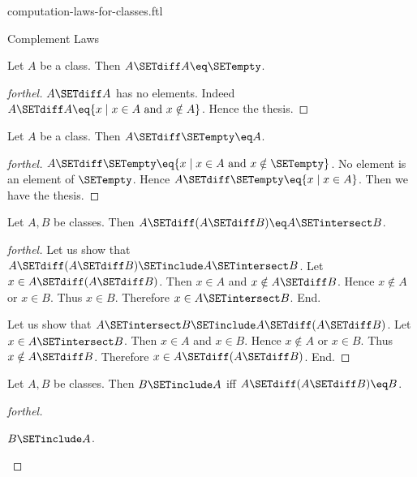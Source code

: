 \documentclass{naproche-library}
\begin{document}
\begin{smodule}[title=Computation Laws For Classes]{computation-laws-for-classes.ftl}
\begin{sfragment}{Complement Laws}
  \begin{proposition}[forthel,id=FOUNDATIONS_02_7433299337150464]
    Let $A$ be a class.
    Then $A \SETdiff A \eq \SETempty$.
  \end{proposition}
  \begin{proof}[forthel]
    $A \SETdiff A$ has no elements.
    Indeed $A \SETdiff A \eq \{ x \mid x \in A\text{ and }x \notin A \}$.
    Hence the thesis.
  \end{proof}

  \begin{proposition}[forthel,id=FOUNDATIONS_02_3783696985358336]
    Let $A$ be a class.
    Then $A \SETdiff \SETempty \eq A$.
  \end{proposition}
  \begin{proof}[forthel]
    $A \SETdiff \SETempty \eq \{ x \mid x \in A\text{ and }x \notin \SETempty \}$.
    No element is an element of $\SETempty$.
    Hence $A \SETdiff \SETempty \eq \{ x \mid x \in A \}$.
    Then we have the thesis.
  \end{proof}

  \begin{proposition}[forthel,id=FOUNDATIONS_02_7083929257377792]
    Let $A, B$ be classes.
    Then $A \SETdiff (A \SETdiff B) \eq A \SETintersect B$.
  \end{proposition}
  \begin{proof}[forthel]
    Let us show that $A \SETdiff (A \SETdiff B) \SETinclude A \SETintersect B$.
      Let $x \in A \SETdiff (A \SETdiff B)$.
      Then $x \in A$ and $x \notin A \SETdiff B$.
      Hence $x \notin A$ or $x \in B$.
      Thus $x \in B$.
      Therefore $x \in A \SETintersect B$.
    End.

    Let us show that $A \SETintersect B \SETinclude A \SETdiff (A \SETdiff B)$.
      Let $x \in A \SETintersect B$.
      Then $x \in A$ and $x \in B$.
      Hence $x \notin A$ or $x \in B$.
      Thus $x \notin A \SETdiff B$.
      Therefore $x \in A \SETdiff (A \SETdiff B)$.
    End.
  \end{proof}

  \begin{proposition}[forthel,id=FOUNDATIONS_02_4938646769631232]
    Let $A, B$ be classes.
    Then $B \SETinclude A$ iff $A \SETdiff (A \SETdiff B) \eq B$.
  \end{proposition}
  \begin{proof}[forthel]
    \begin{case}{$B \SETinclude A$.} \end{case}


\end{proof}
\end{sfragment}
\end{smodule}
\end{document}
